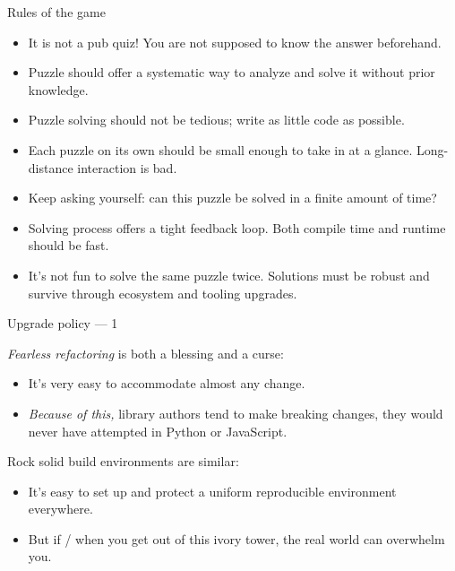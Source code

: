 \documentclass[handout]{beamer}
\begin{document}
\begin{frame}{Rules of the game}

\begin{itemize}[<+->]

\item It is not a pub quiz! You are not supposed to know the answer beforehand.

\item Puzzle should offer a systematic
      way to analyze and solve it without prior knowledge.

\item Puzzle solving should not be tedious; write as little code as possible.

\item Each puzzle on its own should be small enough to take in at a glance.
      Long-distance interaction is bad.

\item Keep asking yourself: can this puzzle be solved in a finite amount of time?

\item Solving process offers a tight feedback loop.
      Both compile time and runtime should be fast.

\item It's not fun to solve the same puzzle twice. Solutions must be robust
      and survive through ecosystem and tooling upgrades.

\end{itemize}
\end{frame}


\begin{frame}{Upgrade policy --- 1}

{\it Fearless refactoring} is both a blessing and a curse:
\begin{itemize}[<+->]
  \item It's very easy to accommodate almost any change.
  \item {\it Because of this,} library authors tend to make breaking changes,
        they would never have attempted in Python or JavaScript.
\end{itemize}

\bigskip
\bigskip
\bigskip

\pause

Rock solid build environments are similar:
\begin{itemize}[<+->]
  \item It's easy to set up and protect
        a uniform reproducible environment everywhere.
  \item But if / when you get out of this ivory tower,
        the real world can overwhelm you.
\end{itemize}

\end{frame}
\end{document}
